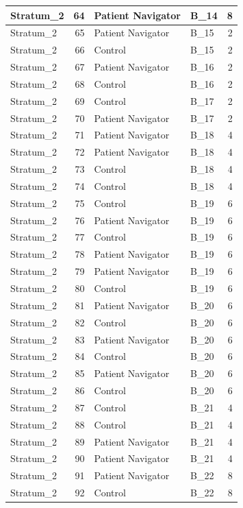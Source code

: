 \documentclass[
]{book}
\begin{document}
\begin{table}[H]
\begin{tabular}{l|r|l|l|r}
\hline
Stratum\_2 & 64 & Patient Navigator & B\_14 & 8\\
\hline
Stratum\_2 & 65 & Patient Navigator & B\_15 & 2\\
\hline
Stratum\_2 & 66 & Control & B\_15 & 2\\
\hline
Stratum\_2 & 67 & Patient Navigator & B\_16 & 2\\
\hline
Stratum\_2 & 68 & Control & B\_16 & 2\\
\hline
Stratum\_2 & 69 & Control & B\_17 & 2\\
\hline
Stratum\_2 & 70 & Patient Navigator & B\_17 & 2\\
\hline
Stratum\_2 & 71 & Patient Navigator & B\_18 & 4\\
\hline
Stratum\_2 & 72 & Patient Navigator & B\_18 & 4\\
\hline
Stratum\_2 & 73 & Control & B\_18 & 4\\
\hline
Stratum\_2 & 74 & Control & B\_18 & 4\\
\hline
Stratum\_2 & 75 & Control & B\_19 & 6\\
\hline
Stratum\_2 & 76 & Patient Navigator & B\_19 & 6\\
\hline
Stratum\_2 & 77 & Control & B\_19 & 6\\
\hline
Stratum\_2 & 78 & Patient Navigator & B\_19 & 6\\
\hline
Stratum\_2 & 79 & Patient Navigator & B\_19 & 6\\
\hline
Stratum\_2 & 80 & Control & B\_19 & 6\\
\hline
Stratum\_2 & 81 & Patient Navigator & B\_20 & 6\\
\hline
Stratum\_2 & 82 & Control & B\_20 & 6\\
\hline
Stratum\_2 & 83 & Patient Navigator & B\_20 & 6\\
\hline
Stratum\_2 & 84 & Control & B\_20 & 6\\
\hline
Stratum\_2 & 85 & Patient Navigator & B\_20 & 6\\
\hline
Stratum\_2 & 86 & Control & B\_20 & 6\\
\hline
Stratum\_2 & 87 & Control & B\_21 & 4\\
\hline
Stratum\_2 & 88 & Control & B\_21 & 4\\
\hline
Stratum\_2 & 89 & Patient Navigator & B\_21 & 4\\
\hline
Stratum\_2 & 90 & Patient Navigator & B\_21 & 4\\
\hline
Stratum\_2 & 91 & Patient Navigator & B\_22 & 8\\
\hline
Stratum\_2 & 92 & Control & B\_22 & 8\\

\end{tabular}
\end{table}
\end{document}
